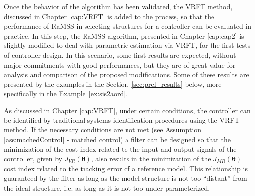Once the behavior of the algorithm has been validated, the VRFT method, discussed in Chapter \ref{cap:VRFT} is added to the process, so that the performance of RaMSS in selecting structures for a controller can be evaluated in practice.
In this step, the RaMSS algorithm, presented in Chapter \ref{cap:cap2} is slightly modified to deal with parametric estimation via VRFT, for the first tests of controller design.
In this scenario, some first results are expected, without major commitments with good performances, but they are of great value for analysis and comparison of the proposed modifications. Some of these results are presented by the examples in the Section~\ref{sec:prel_results} below, more specifically in the Example~\ref{ex:sis2aord}.

As discussed in Chapter \ref{cap:VRFT}, under certain conditions, the controller can be identified by traditional systems identification procedures using the VRFT method.
If the necessary conditions are not met (see Assumption \ref{ass:machedControl} - matched control) a filter can be designed so that the minimization of the cost index related to the input and output signals of the controller, given by $J_{VR}(\bm{\theta})$, also results in the minimization of the $J_{MR}(\bm{\theta})$ cost index related to the tracking error of a reference model.
This relationship is guaranteed by the filter as long as the model structure is not too ``distant'' from the ideal structure, i.e. as long as it is not too under-parameterized.

